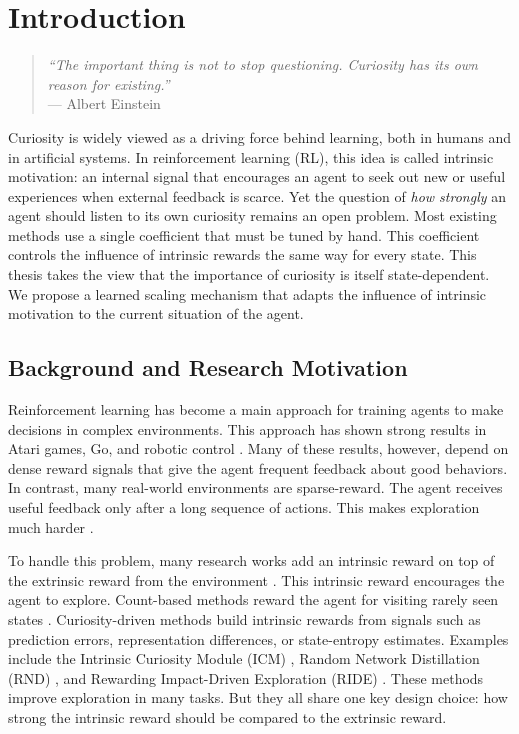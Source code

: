 \chapter{Introduction}

\begin{quote}
\textit{``The important thing is not to stop questioning. Curiosity has its own reason for existing.''} \\
\hspace*{\fill}--- Albert Einstein
\end{quote}

Curiosity is widely viewed as a driving force behind learning, both in humans and in artificial systems. In reinforcement learning (RL), this idea is called intrinsic motivation: an internal signal that encourages an agent to seek out new or useful experiences when external feedback is scarce. Yet the question of \textit{how strongly} an agent should listen to its own curiosity remains an open problem. Most existing methods use a single coefficient that must be tuned by hand. This coefficient controls the influence of intrinsic rewards the same way for every state. This thesis takes the view that the importance of curiosity is itself state-dependent. We propose a learned scaling mechanism that adapts the influence of intrinsic motivation to the current situation of the agent.

\section{Background and Research Motivation}
Reinforcement learning has become a main approach for training agents to make decisions in complex environments. This approach has shown strong results in Atari games, Go, and robotic control \cite{mnih2015human,silver2016go,sutton2018rl}. Many of these results, however, depend on dense reward signals that give the agent frequent feedback about good behaviors. In contrast, many real-world environments are sparse-reward. The agent receives useful feedback only after a long sequence of actions. This makes exploration much harder \cite{francois2018deep}.

To handle this problem, many research works add an intrinsic reward on top of the extrinsic reward from the environment \cite{oudeyer2007intrinsic,schmidhuber2010formal}. This intrinsic reward encourages the agent to explore. Count-based methods reward the agent for visiting rarely seen states \cite{bellemare2016count,tang2017exploration,ostrovski2017count}. Curiosity-driven methods build intrinsic rewards from signals such as prediction errors, representation differences, or state-entropy estimates. Examples include the Intrinsic Curiosity Module (ICM) \cite{pathak2017curiosity}, Random Network Distillation (RND) \cite{burda2019rnd}, and Rewarding Impact-Driven Exploration (RIDE) \cite{raileanu2020ride}. These methods improve exploration in many tasks. But they all share one key design choice: how strong the intrinsic reward should be compared to the extrinsic reward.

